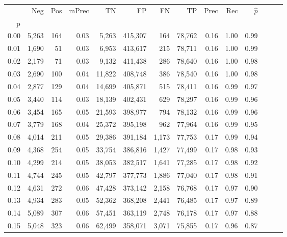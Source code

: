 \begin{tabular}{rrrrrrrrrrrrrr}
\toprule
{} &    Neg &    Pos & mPrec &       TN &       FP &      FN &      TP &  Prec &   Rec & $\hat{p}$ \\
p    &        &        &       &          &          &         &         &       &       &           \\
\midrule
0.00 &  5,263 &    164 &  0.03 &    5,263 &  415,307 &     164 &  78,762 &  0.16 &  1.00 &      0.99 \\
0.01 &  1,690 &     51 &  0.03 &    6,953 &  413,617 &     215 &  78,711 &  0.16 &  1.00 &      0.99 \\
0.02 &  2,179 &     71 &  0.03 &    9,132 &  411,438 &     286 &  78,640 &  0.16 &  1.00 &      0.98 \\
0.03 &  2,690 &    100 &  0.04 &   11,822 &  408,748 &     386 &  78,540 &  0.16 &  1.00 &      0.98 \\
0.04 &  2,877 &    129 &  0.04 &   14,699 &  405,871 &     515 &  78,411 &  0.16 &  0.99 &      0.97 \\
0.05 &  3,440 &    114 &  0.03 &   18,139 &  402,431 &     629 &  78,297 &  0.16 &  0.99 &      0.96 \\
0.06 &  3,454 &    165 &  0.05 &   21,593 &  398,977 &     794 &  78,132 &  0.16 &  0.99 &      0.96 \\
0.07 &  3,779 &    168 &  0.04 &   25,372 &  395,198 &     962 &  77,964 &  0.16 &  0.99 &      0.95 \\
0.08 &  4,014 &    211 &  0.05 &   29,386 &  391,184 &   1,173 &  77,753 &  0.17 &  0.99 &      0.94 \\
0.09 &  4,368 &    254 &  0.05 &   33,754 &  386,816 &   1,427 &  77,499 &  0.17 &  0.98 &      0.93 \\
0.10 &  4,299 &    214 &  0.05 &   38,053 &  382,517 &   1,641 &  77,285 &  0.17 &  0.98 &      0.92 \\
0.11 &  4,744 &    245 &  0.05 &   42,797 &  377,773 &   1,886 &  77,040 &  0.17 &  0.98 &      0.91 \\
0.12 &  4,631 &    272 &  0.06 &   47,428 &  373,142 &   2,158 &  76,768 &  0.17 &  0.97 &      0.90 \\
0.13 &  4,934 &    283 &  0.05 &   52,362 &  368,208 &   2,441 &  76,485 &  0.17 &  0.97 &      0.89 \\
0.14 &  5,089 &    307 &  0.06 &   57,451 &  363,119 &   2,748 &  76,178 &  0.17 &  0.97 &      0.88 \\
0.15 &  5,048 &    323 &  0.06 &   62,499 &  358,071 &   3,071 &  75,855 &  0.17 &  0.96 &      0.87 \\

\end{tabular}
